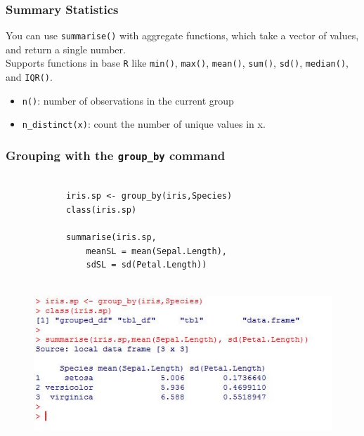 \documentclass{beamer}
\begin{document}
	\begin{frame}
		\frametitle{Summary Statistics}
		\large
		You can use \texttt{summarise()} with aggregate functions, which take a vector of values, and return a single number.\\ \bigskip Supports functions in base \texttt{R} like \texttt{min()}, \texttt{max()}, \texttt{mean()}, \texttt{sum()}, \texttt{sd()}, \texttt{median()}, and \texttt{IQR()}.\\ \bigskip 
		\begin{itemize}
			\item 
			\texttt{n()}: number of observations in the current group
			\item 
			\texttt{n\_distinct(x)}: count the number of unique values in x.
		\end{itemize}
		
	\end{frame}
	\begin{frame}[fragile]
		\frametitle{Grouping with the \texttt{group\_by} command}
		\large
		\vspace{-1cm}
		\begin{framed}
			\begin{verbatim}
			
			iris.sp <- group_by(iris,Species)
			class(iris.sp)
			
			summarise(iris.sp,
			    meanSL = mean(Sepal.Length), 
			    sdSL = sd(Petal.Length))
			
			\end{verbatim}
		\end{framed}
	\end{frame}
	\begin{frame}
		\begin{figure}
			\centering
			\includegraphics[width=1.15\linewidth]{images/irisgroupby}
		\end{figure}
	\end{frame}	
\end{document}
